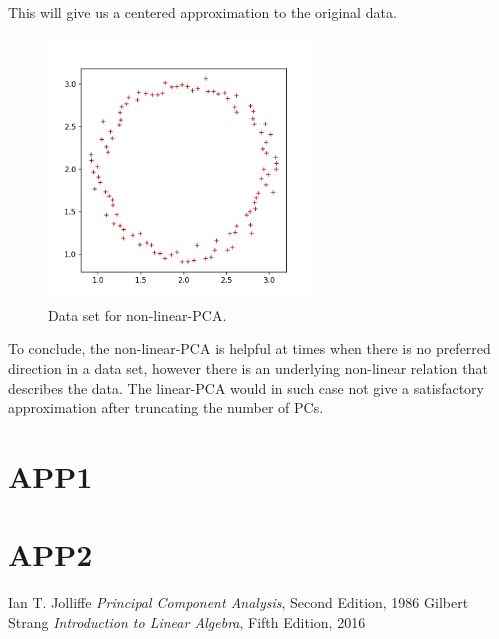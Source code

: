 \documentclass[20pt,twocolumn]{article}
\begin{document}
This will give us a centered approximation to the original data. 

\begin{figure}[H]
\centering\includegraphics[width=7cm]{../python/PCA-fake-datasets/PCA_nonlinear_scatter_2.png}
\caption{Data set for non-linear-PCA.}			
\label{fig:nonlinear_PCA_data}
\end{figure}

To conclude, the non-linear-PCA is helpful at times when there is no preferred direction in a data set, however there is an underlying non-linear relation that describes the data. The linear-PCA would in such case not give a satisfactory approximation after truncating the number of PCs. 




\appendix

\section{APP1} \label{app:A}

\section{APP2} \label{app:B}

\thebibliography{}

 Ian T. Jolliffe \textit{Principal Component Analysis}, Second Edition, 1986
 Gilbert Strang \textit{Introduction to Linear Algebra}, Fifth Edition, 2016

 \label{bib:pope}
\end{document}
